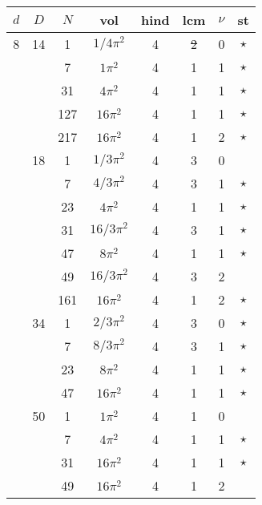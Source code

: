 \documentclass[12pt]{amsart}
\providecommand{\DIFadd}[1]{{\protect\color{blue}\uwave{#1}}} %
\providecommand{\DIFdel}[1]{{\protect\color{red}\sout{#1}}}                      %
\providecommand{\DIFaddbegin}{} %
\providecommand{\DIFaddend}{} %
\providecommand{\DIFdelbegin}{} %
\providecommand{\DIFdelend}{} %
\begin{document}
\begin{tabular}{ccc|ccccc}
$d$ & $D$ & $N$ & vol & hind & lcm & $\nu$ & st\\
\hline 
\DIFaddend 8 & 14 & 1 & \DIFdelbegin \DIFdel{$1/4\pi^2$ }\DIFdelend \DIFaddbegin \DIFadd{$(1/4)\pi^2$ }\DIFaddend & 4 & \DIFdelbegin \DIFdel{2 }\DIFdelend \DIFaddbegin \DIFadd{4 }\DIFaddend & 0 & $\star$ \\
 &  & 7 & \DIFdelbegin \DIFdel{$1\pi^2$ }\DIFdelend \DIFaddbegin \DIFadd{$\pi^2$ }\DIFaddend & 4 & 1 & 1 & $\star$ \\
 &  & 31 & $4\pi^2$ & 4 & 1 & 1 & $\star$ \\
 &  & 127 & $16\pi^2$ & 4 & 1 & 1 & $\star$ \\
 &  & 217 & $16\pi^2$ & 4 & 1 & 2 & $\star$ \\
 & 18 & 1 & \DIFdelbegin \DIFdel{$1/3\pi^2$ }\DIFdelend \DIFaddbegin \DIFadd{$(1/3)\pi^2$ }\DIFaddend & 4 & 3 & 0 &  \\
 &  & 7 & \DIFdelbegin \DIFdel{$4/3\pi^2$ }\DIFdelend \DIFaddbegin \DIFadd{$(4/3)\pi^2$ }\DIFaddend & 4 & 3 & 1 & $\star$ \\
 &  & 23 & $4\pi^2$ & 4 & 1 & 1 & $\star$ \\
 &  & 31 & \DIFdelbegin \DIFdel{$16/3\pi^2$ }\DIFdelend \DIFaddbegin \DIFadd{$(16/3)\pi^2$ }\DIFaddend & 4 & 3 & 1 & $\star$ \\
 &  & 47 & $8\pi^2$ & 4 & 1 & 1 & $\star$ \\
 &  & 49 & \DIFdelbegin \DIFdel{$16/3\pi^2$ }\DIFdelend \DIFaddbegin \DIFadd{$(16/3)\pi^2$ }\DIFaddend & 4 & 3 & 2 &  \\
 &  & 161 & $16\pi^2$ & 4 & 1 & 2 & $\star$ \\
 & 34 & 1 & \DIFdelbegin \DIFdel{$2/3\pi^2$ }\DIFdelend \DIFaddbegin \DIFadd{$(2/3)\pi^2$ }\DIFaddend & 4 & 3 & 0 & $\star$ \\
 &  & 7 & \DIFdelbegin \DIFdel{$8/3\pi^2$ }\DIFdelend \DIFaddbegin \DIFadd{$(8/3)\pi^2$ }\DIFaddend & 4 & 3 & 1 & $\star$ \\
 &  & 23 & $8\pi^2$ & 4 & 1 & 1 & $\star$ \\
 &  & 47 & $16\pi^2$ & 4 & 1 & 1 & $\star$ \\
 & 50 & 1 & \DIFdelbegin \DIFdel{$1\pi^2$ }\DIFdelend \DIFaddbegin \DIFadd{$\pi^2$ }\DIFaddend & 4 & 1 & 0 &  \\
 &  & 7 & $4\pi^2$ & 4 & 1 & 1 & $\star$ \\
 &  & 31 & $16\pi^2$ & 4 & 1 & 1 & $\star$ \\
 &  & 49 & $16\pi^2$ & 4 & 1 & 2 &  \\

\end{tabular}
\end{document}
